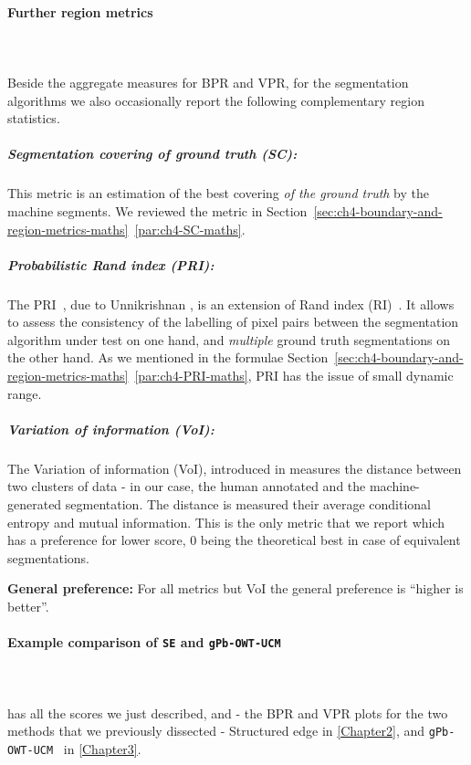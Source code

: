 \paragraph{Further region metrics}\mbox{}\\\mbox{}\\
Beside the aggregate measures for BPR and VPR, for the segmentation algorithms we also occasionally report the following complementary %
region statistics. %
\subparagraph{Segmentation covering of ground truth (SC):} This metric is an estimation of the best covering {\it of the ground truth} by the machine segments. We reviewed the metric in Section~\ref*{sec:ch4-boundary-and-region-metrics-maths}~\ref{par:ch4-SC-maths}.

\subparagraph{Probabilistic Rand index (PRI):} The PRI~\cite{UnnikrishnanPH07}, due to Unnikrishnan \etal, is an extension of Rand index (RI)~\cite{rand1971objective}. It allows to assess the consistency of the labelling of pixel pairs between the segmentation algorithm under test on one hand, and {\it multiple} ground truth segmentations on the other hand. 
As we mentioned in the formulae Section~\ref*{sec:ch4-boundary-and-region-metrics-maths}~\ref{par:ch4-PRI-maths}, PRI has the issue %
of small dynamic range.

\subparagraph{Variation of information (VoI):} The Variation of information (VoI), introduced in \cite{Meila05} measures the distance between two clusters of data - in our case, the human annotated and the machine-generated segmentation. The distance is measured \wrt %
their average conditional entropy and mutual information. This is the only metric that we report which has a preference for lower score, 0 being the theoretical best in case of equivalent segmentations.

\textbf{General preference:} For all metrics but VoI the general preference is ``higher is better''.

\paragraph{Example comparison of {\tt SE} and {\tt gPb-OWT-UCM}}\mbox{}\\\mbox{}\\
 has all the scores we just described, and  - the BPR and VPR plots for the two methods that we previously dissected - Structured edge \cite{DollarICCV13edges} in \cref{Chapter2}, and {\tt gPb-OWT-UCM}~\cite{Arbelaez11} in \cref{Chapter3}. 

